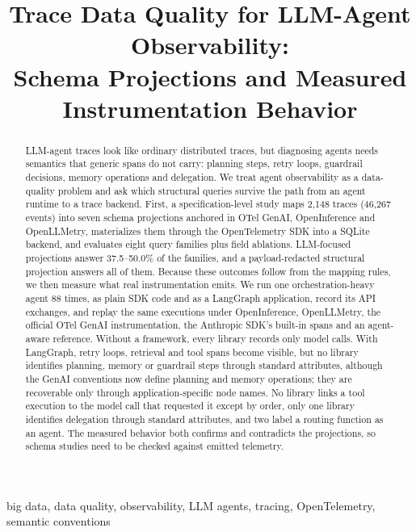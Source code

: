 \documentclass[conference]{IEEEtran}
\begin{document}
\title{Trace Data Quality for LLM-Agent Observability:\\
Schema Projections and Measured Instrumentation Behavior}

\author{
}

\maketitle

\begin{abstract}
LLM-agent traces look like ordinary distributed traces, but diagnosing
agents needs semantics that generic spans do not carry: planning steps,
retry loops, guardrail decisions, memory operations and delegation. We
treat agent observability as a data-quality problem and ask which
structural queries survive the path from an agent runtime to a trace
backend. First, a specification-level study maps 2,148 traces (46,267
events) into seven schema projections anchored in OTel GenAI,
OpenInference and OpenLLMetry, materializes them through the
OpenTelemetry SDK into a SQLite backend, and evaluates eight query
families plus field ablations. LLM-focused projections answer
37.5--50.0\% of the families, and a payload-redacted structural
projection answers all of them. Because these outcomes follow from the
mapping rules, we then measure what real instrumentation emits. We run
one orchestration-heavy agent 88 times, as plain SDK code and as a
LangGraph application, record its API exchanges, and replay the same
executions under OpenInference, OpenLLMetry, the official OTel GenAI
instrumentation, the Anthropic SDK's built-in spans and an agent-aware
reference. Without a framework, every library records only model calls.
With LangGraph, retry loops, retrieval and tool spans become visible,
but no library identifies planning, memory or guardrail steps through
standard attributes, although the GenAI conventions now define planning
and memory operations; they are recoverable only through
application-specific node names. No library links a tool execution to
the model call that requested it except by order, only one library
identifies delegation through standard attributes, and two label a
routing function as an agent. The measured
behavior both confirms and contradicts the projections, so schema
studies need to be checked against emitted telemetry.
\end{abstract}

\begin{IEEEkeywords}
big data, data quality, observability, LLM agents, tracing,
OpenTelemetry, semantic conventions
\end{IEEEkeywords}
\end{document}
